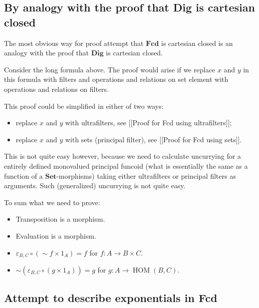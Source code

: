 \subsection{By analogy with the proof that Dig is cartesian closed}

The most obvious way for proof attempt that $\mathbf{Fcd}$ is cartesian closed is an analogy with the proof that
$\mathbf{Dig}$ is cartesian closed.

Consider the long formula above. The proof would arise if we replace $x$ and $y$ in this formula with filters and operations and relations on set element with operations and relations on filters.

This proof could be simplified in either of two ways:
\begin{itemize}
\item replace $x$ and $y$ with ultrafilters, see [[Proof for Fcd using ultrafilters]];
\item replace $x$ and $y$ with sets (principal filter), see [[Proof for Fcd using sets]].
\end{itemize}

This is not quite easy however, because we need to calculate uncurrying for a entirely defined monovalued principal funcoid (what is essentially the same as a function of a $\mathbf{Set}$-morphisms) taking either ultrafilters or principal filters as arguments. Such (generalized) uncurrying is not quite easy.

To sum what we need to prove:
\begin{itemize}
\item Transposition is a morphism.
\item Evaluation is a morphism.
\item $\varepsilon_{B,C} \circ ( \sim f \times 1_A) = f$ for $f : A \rightarrow B \times C$.
\item $\sim ( \varepsilon_{B,C} \circ ( g \times 1_A)) = g$ for $g : A \rightarrow \operatorname{HOM} ( B , C)$.
\end{itemize}

\subsection{Attempt to describe exponentials in Fcd}

